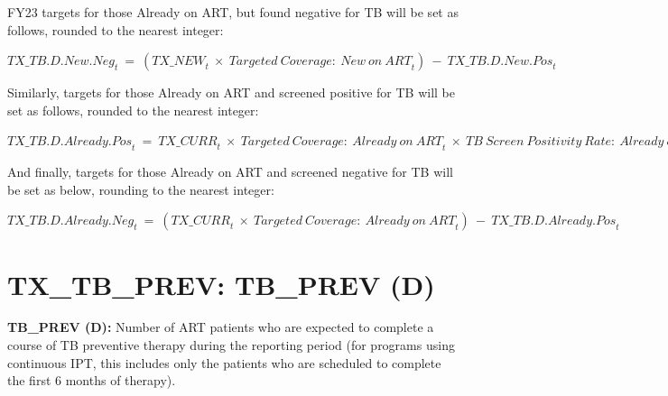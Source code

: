 \documentclass[
  openany]{book}
\begin{document}
FY23 targets for those Already on ART, but found negative for TB will be
set as follows, rounded to the nearest integer:

\begin{center} ${TX\_ TB.D.New.Neg}_{t}\  = \ ({TX\_ NEW}_{t}\  \times \ {Targeted\ Coverage:\ New\ on\ ART}_{t})\  - \ {TX\_ TB.D.New.Pos}_{t}$ \end{center}

Similarly, targets for those Already on ART and screened positive for TB
will be set as follows, rounded to the nearest integer:

\begin{center} ${TX\_ TB.D.Already.Pos}_{t}\  = \ {TX\_ CURR}_{t}\  \times \ {Targeted\ Coverage:\ Already\ on\ ART}_{t}\  \times \ {TB\ Screen\ Positivity\ Rate:\ Already\ on\ ART}_{t}$ \end{center}

And finally, targets for those Already on ART and screened negative for
TB will be set as below, rounding to the nearest integer:

\begin{center} ${TX\_ TB.D.Already.Neg}_{t}\  = \ ({TX\_ CURR}_{t}\  \times \ {Targeted\ Coverage:\ Already\ on\ ART}_{t})\  - \ {TX\_ TB.D.Already.Pos}_{t}$ \end{center}

\hypertarget{tx_tb_prev-tb_prev-d}{%
\section{TX\_TB\_PREV: TB\_PREV (D)}\label{tx_tb_prev-tb_prev-d}}

\textbf{TB\_PREV (D):} Number of ART patients who are expected to complete a
course of TB preventive therapy during the reporting period (for
programs using continuous IPT, this includes only the patients who are
scheduled to complete the first 6 months of therapy).
\end{document}
